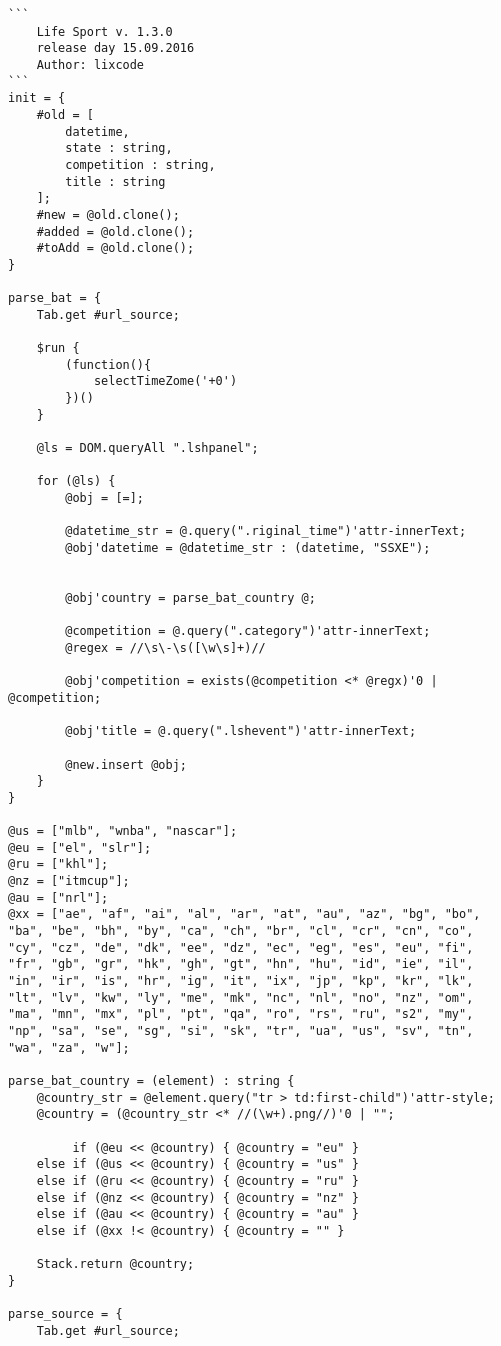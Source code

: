 \begin{lstlisting}
```
	Life Sport v. 1.3.0
	release day 15.09.2016
	Author: lixcode
```
init = {
	#old = [
		datetime, 
		state : string, 
		competition : string, 
		title : string
	];
	#new = @old.clone();
	#added = @old.clone();
	#toAdd = @old.clone();
}

parse_bat = {
	Tab.get #url_source;

	$run {
		(function(){
			selectTimeZome('+0')
		})()
	}

	@ls = DOM.queryAll ".lshpanel";

	for (@ls) {
		@obj = [=];

		@datetime_str = @.query(".riginal_time")'attr-innerText;
		@obj'datetime = @datetime_str : (datetime, "SSXE");

		
		@obj'country = parse_bat_country @;

		@competition = @.query(".category")'attr-innerText;
		@regex = //\s\-\s([\w\s]+)//
		
		@obj'competition = exists(@competition <* @regx)'0 | @competition;

		@obj'title = @.query(".lshevent")'attr-innerText;

		@new.insert @obj;
	}
}

@us = ["mlb", "wnba", "nascar"];
@eu = ["el", "slr"];
@ru = ["khl"];
@nz = ["itmcup"];
@au = ["nrl"];
@xx = ["ae", "af", "ai", "al", "ar", "at", "au", "az", "bg", "bo", "ba", "be", "bh", "by", "ca", "ch", "br", "cl", "cr", "cn", "co", "cy", "cz", "de", "dk", "ee", "dz", "ec", "eg", "es", "eu", "fi", "fr", "gb", "gr", "hk", "gh", "gt", "hn", "hu", "id", "ie", "il", "in", "ir", "is", "hr", "ig", "it", "ix", "jp", "kp", "kr", "lk", "lt", "lv", "kw", "ly", "me", "mk", "nc", "nl", "no", "nz", "om", "ma", "mn", "mx", "pl", "pt", "qa", "ro", "rs", "ru", "s2", "my", "np", "sa", "se", "sg", "si", "sk", "tr", "ua", "us", "sv", "tn", "wa", "za", "w"];

parse_bat_country = (element) : string {
	@country_str = @element.query("tr > td:first-child")'attr-style;
	@country = (@country_str <* //(\w+).png//)'0 | "";

	     if (@eu << @country) { @country = "eu" }
	else if (@us << @country) { @country = "us" }
	else if (@ru << @country) { @country = "ru" }
	else if (@nz << @country) { @country = "nz" }
	else if (@au << @country) { @country = "au" }
	else if (@xx !< @country) { @country = "" }

	Stack.return @country;
}

parse_source = {
	Tab.get #url_source;


\end{lstlisting}

